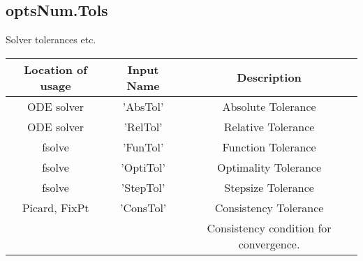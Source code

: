 \documentclass[11pt, a4paper]{article}
\theoremstyle{definition}
\begin{document}
\subsection{optsNum.Tols}
Solver tolerances etc.
\begin{center}
	\begin{tabular}{ | c | c | c |}
		\hline
	     Location of usage & Input Name  & Description  \\ 
		\hline
		ODE solver & 'AbsTol' & Absolute Tolerance  \\
		ODE solver & 'RelTol' & Relative Tolerance  \\ 
		\hline
		fsolve & 'FunTol' & Function Tolerance  \\
		fsolve & 'OptiTol' & Optimality Tolerance  \\ 
		fsolve & 'StepTol' & Stepsize Tolerance  \\ 
		\hline 
		Picard, FixPt & 'ConsTol' & Consistency Tolerance  \\ 
		& & Consistency condition for convergence.\\
		\hline
	\end{tabular}
\end{center}
	
	
\end{document}

